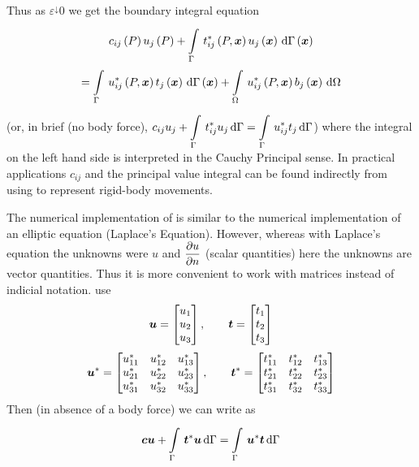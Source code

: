 Thus as $\varepsilon^{\downarrow}0$ we get the boundary integral equation
\begin{multline}
  \fnof{c_{ij}}{P} \fnof{u_{j}}{P} +
  \gint{\Gamma}{}{\fnof{t_{ij}^{*}}{P,\vectr{x}}
    \fnof{u_{j}}{\vectr{x}}}{\fnof{\Gamma}{\vectr{x}}} \\
  = \gint{\Gamma}{}{\fnof{u_{ij}^{*}}{P,\vectr{x}}
    \fnof{t_{j}}{\vectr{x}}}{\fnof{\Gamma}{\vectr{x}}} 
  + \goneint{\fnof{u_{ij}^{*}}{P,\vectr{x}} \fnof{b_{j}}{\vectr{x}}}{\Omega}
  \label{eqn:eqnH}
\end{multline}
(or, in brief (no body force), $c_{ij} u_{j} + \gint{\Gamma}{}{t_{ij}^{*}
u_{j}}{\Gamma} = \gint{\Gamma}{}{u_{ij}^{*} t_{j}}{\Gamma} $) where the
integral on the left hand side is interpreted in the Cauchy Principal sense.
In practical applications $c_{ij}$ and the principal value integral can be
found indirectly from using  to represent rigid-body
movements.

The numerical implementation of  is similar to the numerical 
implementation of an elliptic equation (\eg Laplace's Equation).  However, whereas
with Laplace's equation the unknowns were $u$ and $ \dfrac{\partial u}{\partial n} $ (scalar 
quantities) here the unknowns are vector quantities. Thus it is more 
convenient to work with matrices instead of indicial notation.
\newline \ie use
\begin{displaymath}
   \boldsymbol{u}  = \begin{bmatrix}
    u_{1} \\
    u_{2} \\
    u_{3}
  \end{bmatrix}, \qquad 
   \boldsymbol{t}  = \begin{bmatrix}
    t_{1} \\ 
    t_{2} \\
    t_{3}
  \end{bmatrix}
\end{displaymath}
\begin{displaymath}
   \boldsymbol{u} ^{*} = \begin{bmatrix}
    u_{11}^{*} &  u_{12}^{*} &  u_{13}^{*}\\
    u_{21}^{*} &  u_{22}^{*} &  u_{23}^{*}\\
    u_{31}^{*} &  u_{32}^{*} &  u_{33}^{*}
  \end{bmatrix}, \qquad
   \boldsymbol{t} ^{*} = \begin{bmatrix}
    t_{11}^{*} &  t_{12}^{*} &  t_{13}^{*}\\
    t_{21}^{*} &  t_{22}^{*} &  t_{23}^{*}\\
    t_{31}^{*} &  t_{32}^{*} &  t_{33}^{*}
  \end{bmatrix}
\end{displaymath}
Then (in absence of a body force) we can write  as 
\begin{equation}
  \vectr{cu} + \goneint{\vectr{t}^{*}\vectr{u}}{\Gamma} =
  \goneint{\vectr{u}^{*}\vectr{t}}{\Gamma}
  \label{eqn:eqnH*}
\end{equation}

